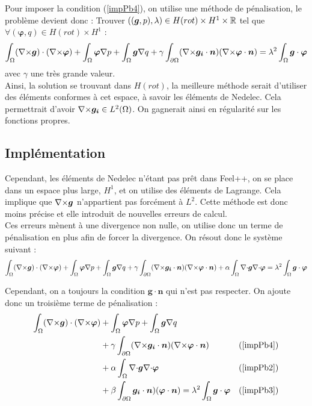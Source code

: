 Pour imposer la condition (\ref{impPb4}), on utilise une méthode de pénalisation, le problème devient donc :
Trouver $((\bm{g},p),\lambda)\in H(rot) \times H^1 \times {\mathbb{R}}$ tel que $\forall (\bm{\varphi},q)\in H(rot) \times H^1$ :
\begin{equation}\label{impFvEigen}
\int_\Omega ({\nabla\times}\bm{g})\cdot({\nabla\times}\bm{\varphi}) + \int_\Omega\bm{\varphi}{\nabla} p + \int_\Omega \bm{g}{\nabla} q + \gamma\int_{\partial\Omega}({\nabla\times}\bm{g_i}\cdot\bm{n})({\nabla\times}\bm{\varphi}\cdot\bm{n}) = \lambda^2\int_\Omega \bm{g}\cdot\bm{\varphi}
\end{equation}
avec $\gamma$ une très grande valeur.\\

Ainsi, la solution se trouvant dans $H(rot)$, la meilleure méthode serait d'utiliser des éléments conformes à cet espace, à savoir les éléments de Nedelec. Cela permettrait d'avoir ${\nabla\times}\bm{g_i}\in L^2(\Omega)$. On gagnerait ainsi en régularité sur les fonctions propres.

\subsection{Implémentation}

Cependant, les éléments de Nedelec n'étant pas prêt dans Feel++, on se place dans un espace plus large, $H^1$, et on utilise des éléments de Lagrange. Cela implique que ${\nabla\times}\bm{g}$ n'appartient pas forcément à $L^2$. Cette méthode est donc moins précise et elle introduit de nouvelles erreurs de calcul.\\

Ces erreurs mènent à une divergence non nulle, on utilise donc un terme de pénalisation en plus afin de forcer la divergence. On résout donc le système suivant :
\[ \int_\Omega ({\nabla\times}\bm{g})\cdot({\nabla\times}\bm{\varphi}) + \int_\Omega\bm{\varphi}{\nabla} p + \int_\Omega \bm{g}{\nabla} q + \gamma\int_{\partial\Omega}({\nabla\times}\bm{g_i}\cdot\bm{n})({\nabla\times}\bm{\varphi}\cdot\bm{n}) + \alpha\int_\Omega {\nabla\cdot}\bm{g}{\nabla\cdot}\bm{\varphi} = \lambda^2\int_\Omega \bm{g}\cdot\bm{\varphi} \]

Cependant, on a toujours la condition $\bm{g}\cdot\bm{n}$ qui n'est pas respecter. On ajoute donc un troisième terme de pénalisation :
\begin{align*}
\int_\Omega ({\nabla\times}\bm{g})\cdot({\nabla\times}\bm{\varphi}) &+ \int_\Omega\bm{\varphi}{\nabla} p + \int_\Omega \bm{g}{\nabla} q & \\
&+ \gamma\int_{\partial\Omega}({\nabla\times}\bm{g_i}\cdot\bm{n})({\nabla\times}\bm{\varphi}\cdot\bm{n}) & (\ref{impPb4})\\
& + \alpha\int_\Omega {\nabla\cdot}\bm{g}{\nabla\cdot}\bm{\varphi} & (\ref{impPb2})\\
&+ \beta\int_{\partial\Omega}\bm{g_i}\cdot\bm{n})(\bm{\varphi}\cdot\bm{n})  = \lambda^2\int_\Omega \bm{g}\cdot\bm{\varphi} & (\ref{impPb3})
\end{align*}

